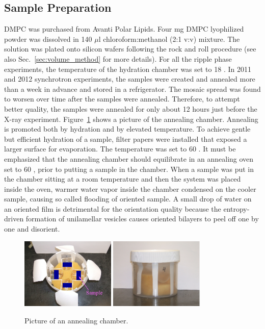 \subsection{Sample Preparation}\label{sec:ripple_sample_prep}
DMPC was purchased from Avanti Polar Lipids.
Four mg DMPC lyophilized powder was dissolved in 140 $\mu$l 
chloroform:methanol (2:1 v:v) 
mixture. The solution was plated onto silicon wafers following the rock and
roll procedure \cite{Tristram-Nagle07_MMB}
(see also Sec.~\ref{sec:volume_method} for more details).
For all the ripple phase experiments, the temperature of the hydration 
chamber was set to 18 \textcelsius. 
In 2011 and 2012 synchrotron experiments, the samples were created and annealed 
more than a week in advance and stored in a refrigerator. The mosaic spread 
was found to worsen over time
after the samples were annealed. Therefore, to attempt better quality, the 
samples were annealed for only about 12 hours just before the X-ray experiment.
Figure~\ref{fig:annealing_chamber} shows a picture of the annealing chamber.
Annealing is promoted both by hydration and by elevated temperature. 
To achieve gentle but efficient hydration of a sample, filter papers were installed
that exposed a larger surface for evaporation. The temperature was set to
60 \textcelsius.
It must be emphasized that the annealing 
chamber should equilibrate in an annealing oven set to 60 \textcelsius,
prior to putting a sample in the chamber.
When a sample was put in the chamber sitting at a room temperature and
then the system was placed inside the oven, warmer water vapor inside the chamber 
condensed on the cooler sample, causing so called flooding of oriented sample. 
A small drop of water on an oriented film is detrimental for the orientation quality because the
entropy-driven formation of unilamellar vesicles causes oriented bilayers to 
peel off one by one and disorient. 

\begin{figure}[htbp]
  \centering
  \includegraphics[width=0.4\textwidth]{figures/ripple/MMs/annealing_chamber_topview}
  \quad
  \includegraphics[width=0.4\textwidth]{figures/ripple/MMs/annealing_chamber_sideview}  
  \caption[Pictures of an annealing chamber]{Picture of an annealing chamber.}
  \label{fig:annealing_chamber}
\end{figure}

